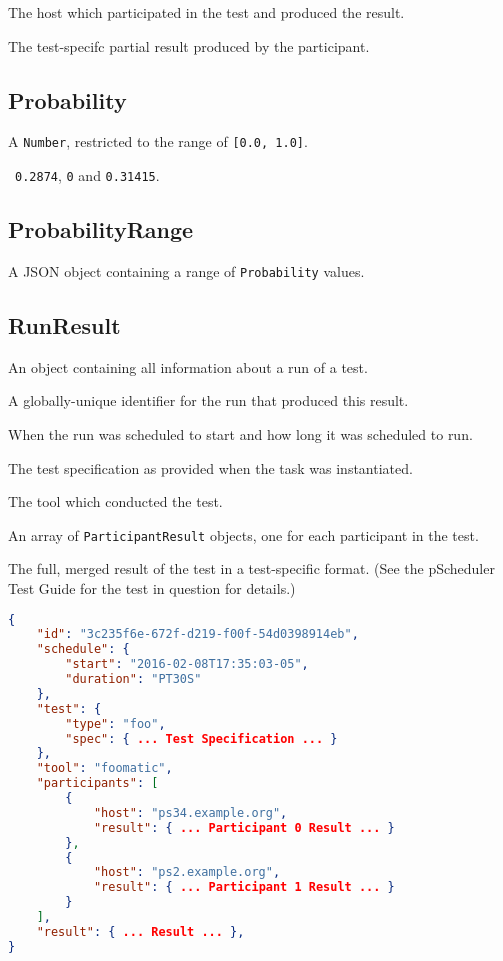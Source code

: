 \documentclass[10pt]{article}
\begin{document}
 The host which participated in the test
and produced the result.

 The test-specifc partial result produced
by the participant.



\subsection{Probability}
A {\tt Number}, restricted to the range of {\tt [0.0, 1.0]}.

\example\ {\tt 0.2874}, {\tt 0} and {\tt 0.31415}.


\subsection{ProbabilityRange}
A JSON object containing a range of {\tt Probability} values.



\subsection{RunResult}
An object containing all information about a run of a test.

 A globally-unique identifier for the run that
produced this result.

 When the run was scheduled to start
and how long it was scheduled to run.

 The test specification as provided
when the task was instantiated.

 The tool which conducted the
test.

 An array of {\tt ParticipantResult}
objects, one for each participant in the test.

 The full, merged result of the test in a
test-specific format.  (See the pScheduler Test Guide for the test in
question for details.)

\example
\begin{lstlisting}[language=json]
{
    "id": "3c235f6e-672f-d219-f00f-54d0398914eb",
    "schedule": {
        "start": "2016-02-08T17:35:03-05",
        "duration": "PT30S"
    },
    "test": {
        "type": "foo",
        "spec": { ... Test Specification ... }
    },
    "tool": "foomatic",
    "participants": [
        {
            "host": "ps34.example.org",
            "result": { ... Participant 0 Result ... }
        },
        {
            "host": "ps2.example.org",
            "result": { ... Participant 1 Result ... }
        }
    ],
    "result": { ... Result ... },
}
\end{lstlisting}
\end{document}
